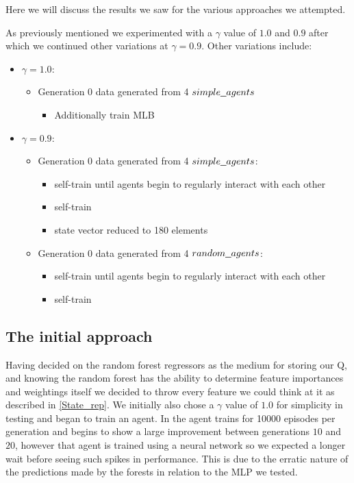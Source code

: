 Here we will discuss the results we saw for the various approaches we attempted.

As previously mentioned we experimented with a $\gamma$ value of $1.0$ and $0.9$ after which we continued other variations at $\gamma = 0.9$.
Other variations include:
\begin{itemize}
	\item $\gamma = 1.0$:
	\begin{itemize}
		\item Generation 0 data generated from 4 $\code{simple\_agents}$
		\begin{itemize}
			\item Additionally train MLB
		\end{itemize}
	\end{itemize}
	\item $\gamma = 0.9$:
	\begin{itemize}
		\item Generation 0 data generated from 4 $\code{simple\_agents}$:
		\begin{itemize}
			\item self-train until agents begin to regularly interact with each other
			\item self-train
			\item state vector reduced to 180 elements
		\end{itemize}
		\item Generation 0 data generated from 4 $\code{random\_agents}$:
		\begin{itemize}
			\item self-train until agents begin to regularly interact with each other
			\item self-train
		\end{itemize}
	\end{itemize}
\end{itemize}

\subsection{The initial approach}

Having decided on the random forest regressors as the medium for storing our Q, and knowing the random forest has the ability to determine feature importances and weightings itself we decided to throw every feature we could think at it as described in \ref{State_rep}. We initially also chose a $\gamma$ value of $1.0$ for simplicity in testing and began to train an agent. In \cite{paper} the agent trains for 10000 episodes per generation and begins to show a large improvement between generations $10$ and $20$, however that agent is trained using a neural network so we expected a longer wait before seeing such spikes in performance. This is due to the erratic nature of the predictions made by the forests in relation to the MLP we tested.


